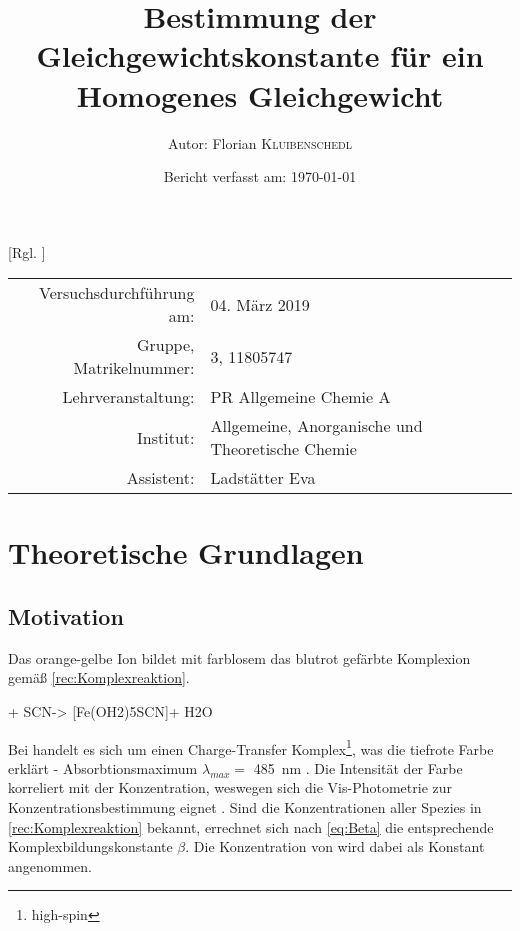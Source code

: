 \documentclass{article}
\title{Bestimmung der Gleichgewichtskonstante für ein Homogenes Gleichgewicht \cite{Versuchsvorschrift}} %
\author{Autor: Florian \textsc{Kluibenschedl}} %
\date{Bericht verfasst am: \today} %
\begin{document}
  [Rgl. ]{}{}
  
  \maketitle %
  
  \begin{center}
    \begin{tabular}{r p{4cm}}
      Versuchsdurchführung am: & 04. März 2019\\ %
      Gruppe, Matrikelnummer: & 3, 11805747 \\
      Lehrveranstaltung: & PR Allgemeine Chemie A \\
      Institut: & Allgemeine, Anorganische und Theoretische Chemie \\
      Assistent: & Ladstätter Eva %
    \end{tabular}
  \end{center}


  \begin{abstract}
    
  \end{abstract}
  
  \pagebreak
  
  \section{Theoretische Grundlagen}
  
    \subsection{Motivation} \label{sec:Motivation}
      
      Das orange-gelbe  Ion bildet mit farblosem  das blutrot gefärbte Komplexion \ch{[Fe(OH2)5SCN]\pch[2]} gemäß \ref{rec:Komplexreaktion}. 

      \begin{reaction}
        [Fe(OH2)6]\pch[3] + SCN\mch -> [Fe(OH2)5SCN]\pch[2] + H2O \label{rec:Komplexreaktion} \\
      \end{reaction}
      
      Bei \ch{[Fe(OH2)5SCN]\pch[2]} handelt es sich um einen Charge-Transfer Komplex\footnote{high-spin}, was die tiefrote Farbe erklärt - Absorbtionsmaximum $\lambda _{max} = $ \SI[mode=text]{485}{\nano\meter} \cite[S. 540]{InorganicChemistry}. Die Intensität der Farbe korreliert mit der Konzentration, weswegen sich die Vis-Photometrie zur Konzentrationsbestimmung eignet \cite[S. 108]{TaschenatlasAnallytik}. Sind die Konzentrationen aller Spezies in \ref{rec:Komplexreaktion} bekannt, errechnet sich nach \eqref{eq:Beta} die entsprechende Komplexbildungskonstante $\beta$. Die Konzentration von  wird dabei als Konstant angenommen.
      
\end{document}
